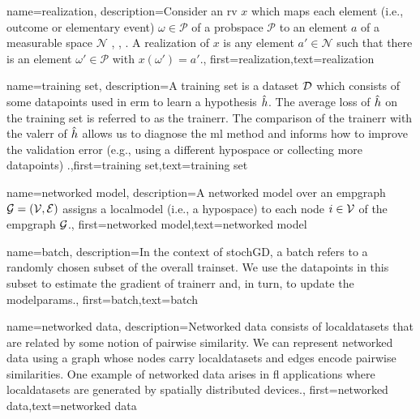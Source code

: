 	
{name={realization},
	description={Consider an \gls{rv} $x$ which maps each element 
	(i.e., outcome or elementary event) $\omega \in \mathcal{P}$ of a \gls{probspace} $\mathcal{P}$ 
	to an element $a$ of a measurable space $\mathcal{N}$ \cite{RudinBookPrinciplesMatheAnalysis}, \cite{HalmosMeasure}, \cite{BillingsleyProbMeasure}. 
	A realization of $x$ is any element $a' \in \mathcal{N}$ such that there is 
	an element $\omega' \in \mathcal{P}$ with $x(\omega') = a'$.}, first={realization},text={realization}  }

{name={training set},
description={A training set is a \gls{dataset} $\mathcal{D}$ which consists of some \gls{datapoint}s used in \gls{erm} 
	to learn a \gls{hypothesis} $\hat{h}$. The average \gls{loss} of $\hat{h}$ on the 
	training set is referred to as the \gls{trainerr}. The comparison of the \gls{trainerr} with the 
	\gls{valerr} of $\hat{h}$ allows us to diagnose the \gls{ml} method and informs how to improve 
	the validation error (e.g., using a different \gls{hypospace} or collecting more \gls{datapoint}s) \cite[Sec. 6.6]{MLBasics}.},first={training set},text={training set}  
}

{name={networked model},
  description={A networked \gls{model} over an \gls{empgraph} $\mathcal{G} = \left( \mathcal{V},\mathcal{E} \right)$ assigns 
   a \gls{localmodel} (i.e., a \gls{hypospace}) to each node $i \in \mathcal{V}$ of the \gls{empgraph} $\mathcal{G}$.}, 
   first={networked model},text={networked model}  
}

{
	name={batch},
	description={In the context of \gls{stochGD}, a batch refers to a randomly 
	chosen subset of the overall \gls{trainset}. We use the \gls{datapoint}s in this subset 
	to estimate the \gls{gradient} of \gls{trainerr} and, in turn, to update the \gls{modelparams}.}, 
	first={batch},text={batch}  
}

{
	name={networked data},
	description={Networked \gls{data} consists of \gls{localdataset}s 
	that are related by some notion of pairwise similarity. We can represent networked 
	\gls{data} using a \gls{graph} whose nodes carry \gls{localdataset}s and edges encode 
	pairwise similarities. One example of networked \gls{data} arises in \gls{fl} applications 
	where \gls{localdataset}s are generated by spatially distributed \gls{device}s.}, 
	first={networked data},text={networked data}  
}


